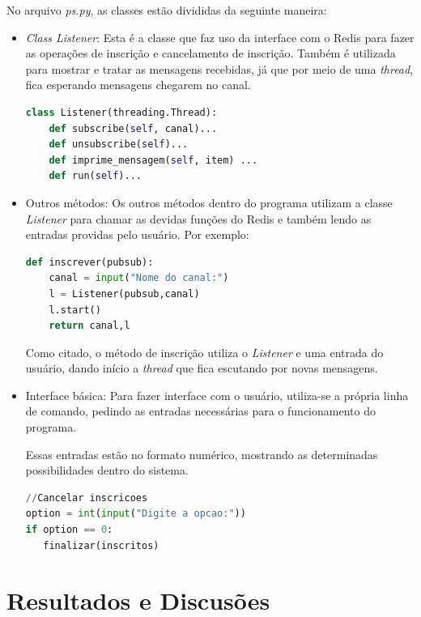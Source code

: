 \documentclass[10pt]{IEEEtran}
\begin{document}
No arquivo \textit{ps.py}, as classes estão divididas da seguinte maneira:
\begin{itemize}
\item \textit{Class Listener}: Esta é a classe que faz uso da interface com o Redis para fazer as operações de inscrição e cancelamento de inscrição. Também é utilizada para mostrar e tratar as mensagens recebidas, já que por meio de uma \textit{thread}, fica esperando mensagens chegarem no canal.

\begin{lstlisting}[language=Python, caption=Classe \textit{Listener}]
class Listener(threading.Thread):
    def subscribe(self, canal)...
    def unsubscribe(self)...
    def imprime_mensagem(self, item) ...
    def run(self)...
\end{lstlisting}

\item Outros métodos: Os outros métodos dentro do programa utilizam a classe \textit{Listener} para chamar as devidas funções do Redis e também lendo as entradas providas pelo usuário.
Por exemplo: 
\begin{lstlisting}[language=Python, caption=Método de Inscrição]
def inscrever(pubsub):
    canal = input("Nome do canal:")
    l = Listener(pubsub,canal)
    l.start()
    return canal,l
\end{lstlisting}

Como citado, o método de inscrição utiliza o \textit{Listener} e uma entrada do usuário, dando início a \textit{thread} que fica escutando por novas mensagens.

\item Interface básica: Para fazer interface com o usuário, utiliza-se a própria linha de comando, pedindo as entradas necessárias para o funcionamento do programa.

Essas entradas estão no formato numérico, mostrando as determinadas possibilidades dentro do sistema.

\begin{lstlisting}[language=Python, caption=Interface]
//Cancelar inscricoes
option = int(input("Digite a opcao:"))
if option == 0:
   finalizar(inscritos)
\end{lstlisting}

\end{itemize}

\section{Resultados e Discusões}
\end{document}
